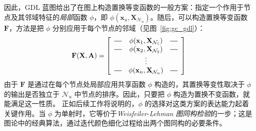
%
因此，GDL 蓝图给出了在图上构造置换等变函数的一般方案：指定一个作用于节点及其邻域特征的\emph{局部}函数 $\phi$，即 $\phi(\mathbf{x}_u, \mathbf{X}_{\mathcal{N}_u})$。随后，可以构造置换等变函数 $\mathbf{F}$，方法是把 $\phi$ 分别应用于每个节点的邻域（见图~\ref{fig:gc_gdl}）：
\begin{equation}
    \mathbf{F}({\bf X}, {\bf A}) =
\left[
  \begin{array}{ccc}
    \horzbar & \phi(\mathbf{x}_1, \mathbf{X}_{\mathcal{N}_1}) & \horzbar \\
    \horzbar & \phi(\mathbf{x}_2, \mathbf{X}_{\mathcal{N}_2}) & \horzbar \\
             & \vdots    &          \\
    \horzbar & \phi(\mathbf{x}_n, \mathbf{X}_{\mathcal{N}_n}) & \horzbar
  \end{array}
\right]
\label{eq:graph_equivariant}
\end{equation}
由于 $\mathbf{F}$ 是通过在每个节点处局部应用共享函数 $\phi$ 构造的，其置换等变性取决于 $\phi$ 的输出是否独立于 $\mathcal{N}_u$ 中节点的排序。因此，只要把 $\phi$ 构造为置换不变函数，就能满足这一性质。
%
正如后续工作将说明的，$\phi$ 的选择对这类方案的表达能力起着关键作用。当 $\phi$ 为单射时，它等价于{\em Weisfeiler-Lehman 图同构检验}的一步；这是图论中的经典算法，通过迭代颜色细化过程给出两个图同构的必要条件。




